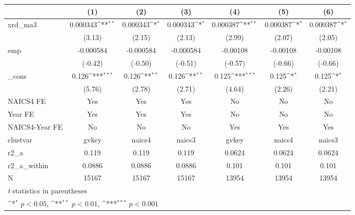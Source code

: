 {
\def\sym#1{\ifmmode^{#1}\else\(^{#1}\)\fi}
\begin{tabular}{l*{6}{c}}
\hline\hline
            &\multicolumn{1}{c}{(1)}         &\multicolumn{1}{c}{(2)}         &\multicolumn{1}{c}{(3)}         &\multicolumn{1}{c}{(4)}         &\multicolumn{1}{c}{(5)}         &\multicolumn{1}{c}{(6)}         \\
\hline
xrd\_ma3     &    0.000343\sym{**} &    0.000343\sym{*}  &    0.000343\sym{*}  &    0.000387\sym{**} &    0.000387\sym{*}  &    0.000387\sym{*}  \\
            &      (3.13)         &      (2.15)         &      (2.13)         &      (2.99)         &      (2.07)         &      (2.05)         \\
[1em]
emp         &   -0.000584         &   -0.000584         &   -0.000584         &    -0.00108         &    -0.00108         &    -0.00108         \\
            &     (-0.42)         &     (-0.50)         &     (-0.51)         &     (-0.57)         &     (-0.66)         &     (-0.66)         \\
[1em]
\_cons      &       0.126\sym{***}&       0.126\sym{**} &       0.126\sym{**} &       0.125\sym{***}&       0.125\sym{*}  &       0.125\sym{*}  \\
            &      (5.76)         &      (2.78)         &      (2.71)         &      (4.64)         &      (2.26)         &      (2.21)         \\
[1em]
NAICS4 FE   &         Yes         &         Yes         &         Yes         &          No         &          No         &          No         \\
[1em]
Year FE     &         Yes         &         Yes         &         Yes         &          No         &          No         &          No         \\
[1em]
NAICS4-Year FE&          No         &          No         &          No         &         Yes         &         Yes         &         Yes         \\
\hline
clustvar    &       gvkey         &      naics4         &      naics3         &       gvkey         &      naics4         &      naics3         \\
r2\_a        &       0.119         &       0.119         &       0.119         &      0.0624         &      0.0624         &      0.0624         \\
r2\_a\_within &      0.0886         &      0.0886         &      0.0886         &       0.101         &       0.101         &       0.101         \\
N           &       15167         &       15167         &       15167         &       13954         &       13954         &       13954         \\
\hline\hline
\multicolumn{7}{l}{\footnotesize \textit{t} statistics in parentheses}\\
\multicolumn{7}{l}{\footnotesize \sym{*} \(p<0.05\), \sym{**} \(p<0.01\), \sym{***} \(p<0.001\)}\\
\end{tabular}
}

